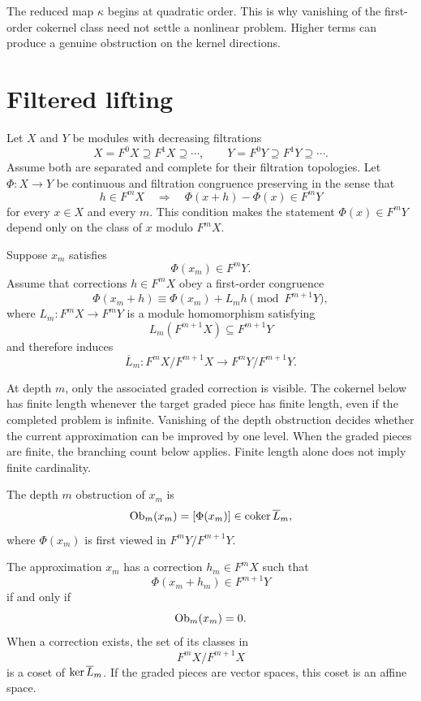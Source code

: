 \begin{remark}\label{rem:higher_obstruction}
The reduced map $\kappa$ begins at quadratic order.  This is why vanishing of the first-order cokernel class need not settle a nonlinear problem.  Higher terms can produce a genuine obstruction on the kernel directions.
\end{remark}

\section{Filtered lifting}\label{sec:filtered_lifting}

Let $X$ and $Y$ be modules with decreasing filtrations
\[
X=F^0X\supseteq F^1X\supseteq\cdots,
\qquad
Y=F^0Y\supseteq F^1Y\supseteq\cdots.
\]
Assume both are separated and complete for their filtration topologies.  Let $\Phi:X\to Y$ be continuous and filtration congruence preserving in the sense that
\[
h\in F^mX
\quad\Longrightarrow\quad
\Phi(x+h)-\Phi(x)\in F^mY
\]
for every $x\in X$ and every $m$.  This condition makes the statement $\Phi(x)\in F^mY$ depend only on the class of $x$ modulo $F^mX$.

Suppose $x_m$ satisfies
\[
\Phi(x_m)\in F^mY.
\]
Assume that corrections $h\in F^mX$ obey a first-order congruence
\[
\Phi(x_m+h)
\equiv
\Phi(x_m)+L_mh
\pmod{F^{m+1}Y},
\]
where $L_m:F^mX\to F^mY$ is a module homomorphism satisfying
\[
L_m(F^{m+1}X)\subseteq F^{m+1}Y
\]
and therefore induces
\[
\overline L_m:
F^mX/F^{m+1}X
\longrightarrow
F^mY/F^{m+1}Y.
\]


At depth $m$, only the associated graded correction is visible. The cokernel below has finite length whenever the target graded piece has finite length, even if the completed problem is infinite. Vanishing of the depth obstruction decides whether the current approximation can be improved by one level. When the graded pieces are finite, the branching count below applies. Finite length alone does not imply finite cardinality.

\begin{definition}\label{def:depth_obstruction}
The depth $m$ obstruction of $x_m$ is
\[
\operatorname{Ob}_m(x_m)
=
[\Phi(x_m)]
\in
\operatorname{coker}\overline L_m,
\]
where $\Phi(x_m)$ is first viewed in $F^mY/F^{m+1}Y$.
\end{definition}

\begin{theorem}\label{thm:one_step_lifting}
The approximation $x_m$ has a correction $h_m\in F^mX$ such that
\[
\Phi(x_m+h_m)\in F^{m+1}Y
\]
if and only if
\[
\operatorname{Ob}_m(x_m)=0.
\]
When a correction exists, the set of its classes in
\[
F^mX/F^{m+1}X
\]
is a coset of $\operatorname{ker}\overline L_m$.  If the graded pieces are vector spaces, this coset is an affine space.
\end{theorem}

